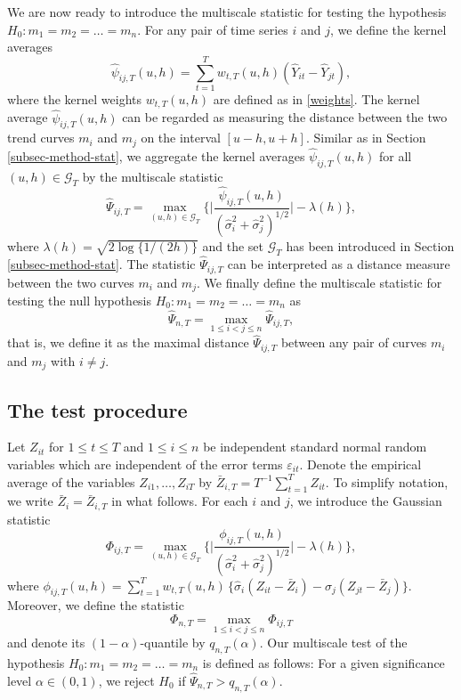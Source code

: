 We are now ready to introduce the multiscale statistic for testing the hypothesis $H_0: m_1 = m_2 = \ldots = m_n$. For any pair of time series $i$ and $j$, we define the kernel averages
\[ \widehat{\psi}_{ij,T}(u,h) = \sum\limits_{t=1}^T w_{t,T}(u,h)(\widehat{Y}_{it} - \widehat{Y}_{jt}), \]
where the kernel weights $w_{t,T}(u,h)$ are defined as in \eqref{weights}. The kernel average $\widehat{\psi}_{ij,T}(u,h)$ can be regarded as measuring the distance between the two trend curves $m_i$ and $m_j$ on the interval $[u-h,u+h]$. Similar as in Section \ref{subsec-method-stat}, we aggregate the kernel averages $\widehat{\psi}_{ij,T}(u,h)$ for all $(u,h) \in \mathcal{G}_T$ by the multiscale statistic 
\[ \widehat{\Psi}_{ij,T} = \max_{(u,h) \in \mathcal{G}_T} \Big\{ \Big|\frac{\widehat{\psi}_{ij,T}(u,h)}{(\widehat{\sigma}_i^2 + \widehat{\sigma}_j^2)^{1/2}}\Big| - \lambda(h) \Big\}, \] 
where $\lambda(h) = \sqrt{2 \log \{ 1/(2h) \}}$ and the set $\mathcal{G}_T$ has been introduced in Section \ref{subsec-method-stat}. The statistic $\widehat{\Psi}_{ij,T}$ can be interpreted as a distance measure between the two curves $m_i$ and $m_j$. We finally define the multiscale statistic for testing the null hypothesis $H_0: m_1 =m_2 = \ldots = m_n$ as
\[ \widehat{\Psi}_{n,T} = \max_{1 \le i < j \le n} \widehat{\Psi}_{ij,T}, \]
that is, we define it as the maximal distance $\widehat{\Psi}_{ij,T}$ between any pair of curves $m_i$ and $m_j$ with $i \ne j$. 


\subsection{The test procedure}\label{subsec-test-equality-test}


Let $Z_{it}$ for $1 \le t \le T$ and $1 \le i \le n$ be independent standard normal random variables which are independent of the error terms $\varepsilon_{it}$. Denote the empirical average of the variables $Z_{i1},\ldots,Z_{iT}$ by $\bar{Z}_{i,T} = T^{-1} \sum_{t=1}^T Z_{it}$. To simplify notation, we write $\bar{Z}_i = \bar{Z}_{i,T}$ in what follows. For each $i$ and $j$, we introduce the Gaussian statistic 
\[ \Phi_{ij,T} = \max_{(u,h) \in \mathcal{G}_T} \Big\{ \Big|\frac{\phi_{ij,T}(u,h)}{(\widehat{\sigma}_i^2 + \widehat{\sigma}_j^2)^{1/2}}\Big| - \lambda(h) \Big\}, \] 
where $\phi_{ij,T}(u,h) = \sum\nolimits_{t=1}^T w_{t,T}(u,h) \, \{ \widehat{\sigma}_i (Z_{it} - \bar{Z}_i) - \widehat{\sigma}_j (Z_{jt} - \bar{Z}_j) \}$. Moreover, we define the statistic
\[ \Phi_{n,T} = \max_{1 \le i < j \le n} \Phi_{ij,T} \]
and denote its $(1-\alpha)$-quantile by $q_{n,T}(\alpha)$. Our multiscale test of the hypothesis $H_0: m_1 = m_2 = \ldots = m_n$ is defined as follows: For a given significance level $\alpha \in (0,1)$, we reject $H_0$ if $\widehat{\Psi}_{n,T} > q_{n,T}(\alpha)$. 


